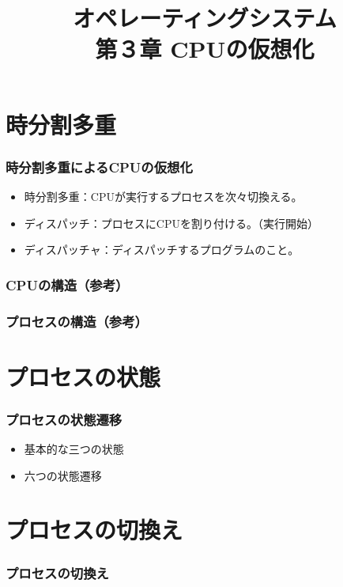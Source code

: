\documentclass[dvipdfmx]{beamer}
\begin{document}
\title[OS]{オペレーティングシステム\\第３章 CPUの仮想化}
\date{}

\begin{frame}
  \titlepage
\end{frame}


\section{時分割多重}
\begin{frame}
  \frametitle{時分割多重によるCPUの仮想化}
  \begin{itemize}
    \item 時分割多重：CPUが実行するプロセスを次々切換える。
    \item ディスパッチ：プロセスにCPUを割り付ける。（実行開始）
    \item ディスパッチャ：ディスパッチするプログラムのこと。
  \end{itemize}
\end{frame}

\begin{frame}
  \frametitle{CPUの構造（参考）}
\end{frame}

\begin{frame}
  \frametitle{プロセスの構造（参考）}
\end{frame}

\section{プロセスの状態}
\begin{frame}
  \frametitle{プロセスの状態遷移}
  \begin{itemize}
    \item 基本的な三つの状態
    \item 六つの状態遷移
  \end{itemize}
\end{frame}

\section{プロセスの切換え}
\begin{frame}
  \frametitle{プロセスの切換え}
\end{frame}
\end{document}
